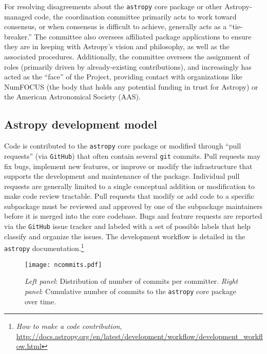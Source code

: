 \documentclass[modern]{aastex61}
\newcommand{\package}[1]{\texttt{#1}\xspace}
\newcommand{\github}{\package{GitHub}}
\newcommand{\astropy}{Astropy\xspace}
\newcommand{\astropypkg}{\package{astropy}}
\begin{document}
For resolving disagreements about the \astropypkg core package or other \astropy-managed code, the coordination committee primarily acts to work toward consensus, or when consensus is difficult to achieve, generally acts as a ``tie-breaker.''
The committee also oversees affiliated package applications to ensure they are in keeping with \astropy's vision and philosophy, as well as the associated procedures.
Additionally, the committee oversees the assignment of roles (primarily driven by already-existing contributions), and increasingly has acted as the ``face'' of the Project, providing contact with organizations like NumFOCUS (the body that holds any potential funding in trust for \astropy) or the American Astronomical Society (AAS).

\subsection{Astropy development model}
Code is contributed to the \astropypkg core package or modified through ``pull
requests'' (via \github) that often contain several \texttt{git} commits.
Pull requests may fix bugs, implement new features, or improve or modify the
infrastructure that supports the development and maintenance of the package.
Individual pull requests are generally limited to a single conceptual addition
or modification to make code review tractable.
Pull requests that modify or add code to a specific subpackage must be reviewed
and approved by one of the subpackage maintainers before it is merged into the
core codebase.
Bugs and feature requests are reported via the \github issue tracker and labeled
with a set of possible labels that help classify and organize the issues.
The development workflow is detailed in the \astropypkg
documentation.\footnote{\emph{How to make a code contribution},
\url{http://docs.astropy.org/en/latest/development/workflow/development_workflow.html}}

\begin{figure}
\texttt{[image: ncommits.pdf]}
\caption{%
    \emph{Left panel}: Distribution of number of commits per committer.
    \emph{Right panel}: Cumulative number of commits to the \astropypkg core
    package over time.
    \label{fig:ncommits}
}
\end{figure}
\end{document}
